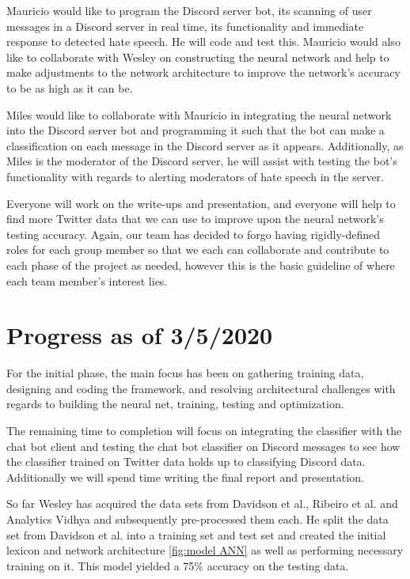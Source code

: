 \documentclass[conference]{sig-alternate-05-2015}
\begin{document}
Mauricio would like to program the Discord server bot, its scanning of user messages in a Discord server in real time, its functionality and immediate response to detected hate speech. He will code and test this.  Mauricio would also like to collaborate with Wesley on constructing the neural network and help to make adjustments to the network architecture to improve the network's accuracy to be as high as it can be.

Miles would like to collaborate with Mauricio in integrating the neural network into the Discord server bot and programming it such that the bot can make a classification on each message in the Discord server as it appears. Additionally, as Miles is the moderator of the Discord server, he will assist with testing the bot's functionality with regards to alerting moderators of hate speech in the server. 

Everyone will work on the write-ups and presentation, and everyone will help to find more Twitter data that we can use to improve upon the neural network's testing accuracy. Again, our team has decided to forgo having rigidly-defined roles for each group member so that we each can collaborate and contribute to each phase of the project as needed, however this is the basic guideline of where each team member's interest lies.


\section{Progress as of 3/5/2020}

For the initial phase, the main focus has been on gathering training data, designing and coding the framework, and resolving architectural challenges with regards to building the neural net, training, testing and optimization. 

The remaining time to completion will focus on integrating the classifier with the chat bot client and testing the chat bot classifier on Discord messages to see how the classifier trained on Twitter data holds up to classifying Discord data. Additionally we will spend time writing the final report and presentation.

So far Wesley has acquired the data sets from Davidson et al., Ribeiro et al. and Analytics Vidhya and subsequently pre-processed them each. He split the data set from Davidson et al. into a training set and test set and created the initial lexicon and network architecture \ref{fig:model ANN} as well as performing necessary training on it. This model yielded a 75\% accuracy on the testing data.
\end{document}
